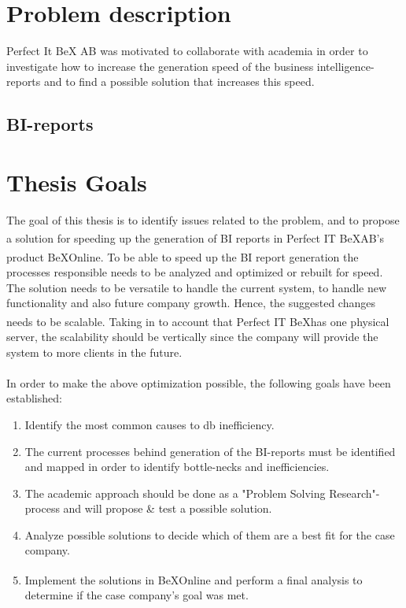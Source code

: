 \documentclass{cslthse-msc}
\newcommand{\bex}{BeX\textsuperscript{\textregistered}}
\begin{document}
\section{Problem description}
Perfect It BeX AB was motivated to collaborate with academia in order to investigate how to increase the generation speed of the business intelligence-reports and to find a possible solution that increases this speed.

\subsection{BI-reports}


\section{Thesis Goals} \label{sec:goals}
The goal of this thesis is to identify issues related to the problem, and to propose a solution for speeding up the generation of BI reports in Perfect IT \bex AB's product \bex Online. To be able to speed up the BI report generation the processes responsible needs to be analyzed and optimized or rebuilt for speed. The solution needs to be versatile to handle the current system, to handle new functionality and also future company growth. Hence, the suggested changes needs to be scalable. Taking in to account that Perfect IT \bex has one physical server, the scalability should be vertically\cite{scalability} since the company will provide the system to more clients in the future.\\\\
In order to make the above optimization possible, the following goals have been established:
\begin{enumerate}
\item Identify the most common causes to db inefficiency.
\item The current processes behind generation of the BI-reports must be identified and mapped in order to identify bottle-necks and inefficiencies.
\item The academic approach should be done as a "Problem Solving Research"-process and will propose \& test a possible solution.
\item Analyze possible solutions to decide which of them are a best fit for the case company.
\item Implement the solutions in \bex Online and perform a final analysis to determine if the case company's goal was met.
\end{enumerate}
  
\end{document}
